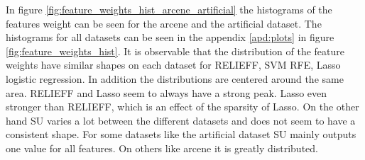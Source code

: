 \documentclass[twoside,11pt]{article}
\begin{document}
In figure \ref{fig:feature_weights_hist_arcene_artificial} the histograms of the features weight can be seen for the arcene and the artificial dataset. The histograms for all datasets can be seen in the appendix \ref{apd:plots} in figure \ref{fig:feature_weights_hist}.
It is observable that the distribution of the feature weights have similar shapes on each dataset for RELIEFF, SVM RFE, Lasso logistic regression. In addition the distributions are centered around the same area. RELIEFF and Lasso seem to always have a strong peak. Lasso even stronger than RELIEFF, which is an effect of the sparsity of Lasso. On the other hand SU varies a lot between the different datasets and does not seem to have a consistent shape. For some datasets like the artificial dataset SU mainly outputs one value for all features. On others like arcene it is greatly distributed. 
\end{document}
